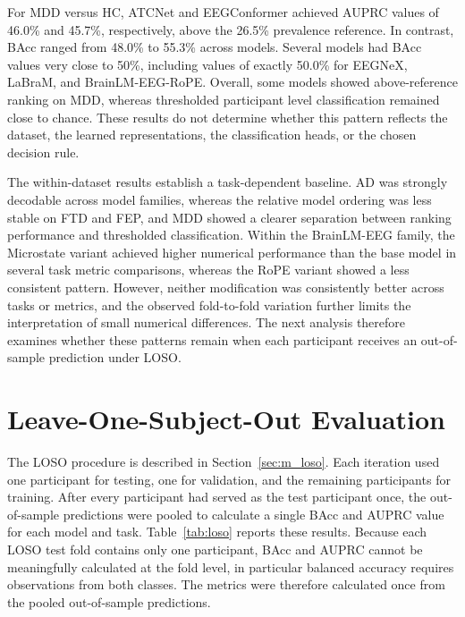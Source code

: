 For MDD versus HC, ATCNet and EEGConformer achieved AUPRC values of 46.0\% and
45.7\%, respectively, above the 26.5\% prevalence reference. In contrast, BAcc
ranged from 48.0\% to 55.3\% across models. Several models had BAcc values very
close to 50\%, including values of exactly 50.0\% for EEGNeX, LaBraM, and
BrainLM-EEG-RoPE. Overall, some models showed above-reference ranking on MDD,
whereas thresholded participant level classification remained close to chance.
These results do not determine whether this pattern reflects the dataset, the
learned representations, the classification heads, or the chosen decision
rule.

The within-dataset results establish a task-dependent baseline. AD was strongly decodable across model families, whereas the relative model ordering was less stable on FTD and FEP, and MDD showed a clearer separation between ranking performance and thresholded classification. Within the BrainLM-EEG family, the Microstate variant achieved higher numerical performance than the base model in several task metric comparisons, whereas the RoPE variant showed a less consistent pattern. However, neither modification was consistently better across tasks or metrics, and the observed fold-to-fold variation further limits the interpretation of small numerical differences. The next analysis therefore examines whether these patterns remain when each participant receives an out-of-sample prediction under LOSO.



\section{Leave-One-Subject-Out Evaluation}\label{sec:r_loso}



The LOSO procedure is described in Section~\ref{sec:m_loso}. Each iteration used one participant for testing, one for validation, and the remaining participants for training. After every participant had served as the test participant once, the out-of-sample predictions were pooled to calculate a single BAcc and AUPRC value for each model and task. Table~\ref{tab:loso} reports these results. Because each LOSO test fold contains only one participant, BAcc and AUPRC cannot be meaningfully calculated at the fold level, in particular balanced accuracy requires observations from both classes. The metrics were therefore calculated once from the pooled out-of-sample predictions.


